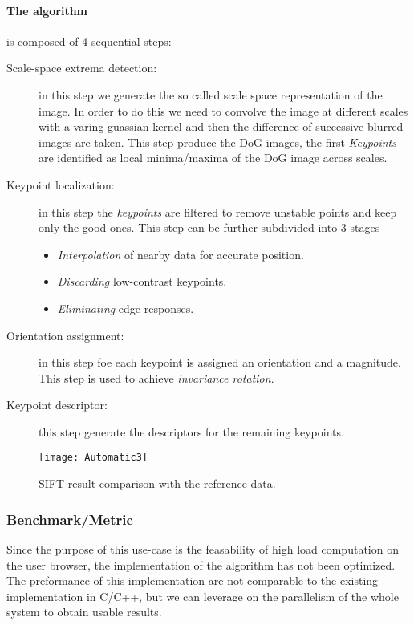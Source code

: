 \paragraph{The algorithm} is composed of 4 sequential steps:
\begin{description}
    \item[Scale-space extrema detection:] in this step we generate the so called
    scale space representation of the image. In order to do this we need to
    convolve the image at different scales with a varing guassian kernel and
    then the difference of successive blurred images are taken. This step
    produce the \ac{DoG} images, the first \emph{Keypoints} are identified as
    local minima/maxima of the \ac{DoG} image across scales.
    
    \item[Keypoint localization:] in this step the \emph{keypoints} are filtered
    to remove unstable points and keep only the good ones. This step can be
    further subdivided into 3 stages
        \begin{itemize}
            \item \emph{Interpolation} of nearby data for accurate position.
            \item \emph{Discarding} low-contrast keypoints.
            \item \emph{Eliminating} edge responses.
        \end{itemize}
    
    \item[Orientation assignment:] in this step foe each keypoint is assigned an
    orientation and a magnitude. This step is used to achieve \emph{invariance
    rotation}.
    
    \item[Keypoint descriptor:] this step generate the descriptors for the
    remaining keypoints.
\end{description}

\begin{figure}[htb]
    \centering
    \texttt{[image: Automatic3]}
    \caption{\acs{SIFT} result comparison with the reference data.}
    \label{fig:Automatic3}
\end{figure}


\subsubsection{Benchmark/Metric}
Since the purpose of this use-case is the feasability of high load computation
on the user browser, the implementation of the algorithm has not been optimized.
The preformance of this implementation are not comparable to the existing
implementation in C/C++, but we can leverage on the parallelism of the whole
system to obtain usable results.

